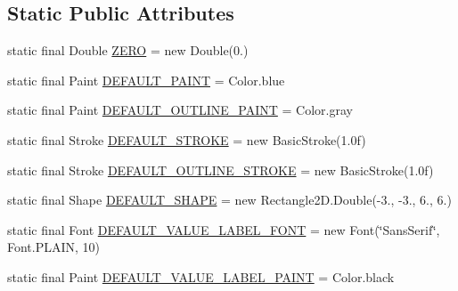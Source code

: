 \subsection*{Static Public Attributes}
\begin{DoxyCompactItemize}
\item 
static final Double \mbox{\hyperlink{classorg_1_1jfree_1_1chart_1_1renderer_1_1_abstract_renderer_afe0614ba0ad7fd9591675c11382746aa}{Z\+E\+RO}} = new Double(0.)
\item 
static final Paint \mbox{\hyperlink{classorg_1_1jfree_1_1chart_1_1renderer_1_1_abstract_renderer_ac86b7ccf225f651f51657bc5958216af}{D\+E\+F\+A\+U\+L\+T\+\_\+\+P\+A\+I\+NT}} = Color.\+blue
\item 
static final Paint \mbox{\hyperlink{classorg_1_1jfree_1_1chart_1_1renderer_1_1_abstract_renderer_a6a3aec7c7769170abd272ece8b64353b}{D\+E\+F\+A\+U\+L\+T\+\_\+\+O\+U\+T\+L\+I\+N\+E\+\_\+\+P\+A\+I\+NT}} = Color.\+gray
\item 
static final Stroke \mbox{\hyperlink{classorg_1_1jfree_1_1chart_1_1renderer_1_1_abstract_renderer_a958eb493f6d9cf3c607aaa7bff997a09}{D\+E\+F\+A\+U\+L\+T\+\_\+\+S\+T\+R\+O\+KE}} = new Basic\+Stroke(1.\+0f)
\item 
static final Stroke \mbox{\hyperlink{classorg_1_1jfree_1_1chart_1_1renderer_1_1_abstract_renderer_a608353a2f1982cda1198fb18f62b143b}{D\+E\+F\+A\+U\+L\+T\+\_\+\+O\+U\+T\+L\+I\+N\+E\+\_\+\+S\+T\+R\+O\+KE}} = new Basic\+Stroke(1.\+0f)
\item 
static final Shape \mbox{\hyperlink{classorg_1_1jfree_1_1chart_1_1renderer_1_1_abstract_renderer_ab125f42f5132fd36f9e1c9232bb1e2d6}{D\+E\+F\+A\+U\+L\+T\+\_\+\+S\+H\+A\+PE}} = new Rectangle2\+D.\+Double(-\/3., -\/3., 6., 6.)
\item 
static final Font \mbox{\hyperlink{classorg_1_1jfree_1_1chart_1_1renderer_1_1_abstract_renderer_a7444bb792013caa306b4ff659d567d33}{D\+E\+F\+A\+U\+L\+T\+\_\+\+V\+A\+L\+U\+E\+\_\+\+L\+A\+B\+E\+L\+\_\+\+F\+O\+NT}} = new Font(\char`\"{}Sans\+Serif\char`\"{}, Font.\+P\+L\+A\+IN, 10)
\item 
static final Paint \mbox{\hyperlink{classorg_1_1jfree_1_1chart_1_1renderer_1_1_abstract_renderer_ad70eafbc357dd6ad5b2e2d9f0ea1a3f9}{D\+E\+F\+A\+U\+L\+T\+\_\+\+V\+A\+L\+U\+E\+\_\+\+L\+A\+B\+E\+L\+\_\+\+P\+A\+I\+NT}} = Color.\+black
\end{DoxyCompactItemize}
